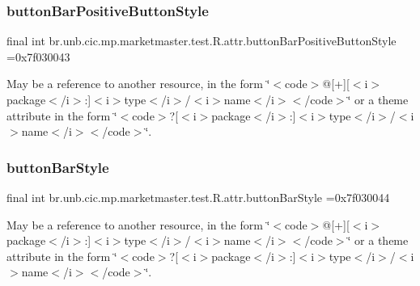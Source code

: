 \subsubsection{\texorpdfstring{button\+Bar\+Positive\+Button\+Style}{buttonBarPositiveButtonStyle}}
{\footnotesize\ttfamily final int br.\+unb.\+cic.\+mp.\+marketmaster.\+test.\+R.\+attr.\+button\+Bar\+Positive\+Button\+Style =0x7f030043\hspace{0.3cm}{\ttfamily [static]}}

May be a reference to another resource, in the form \char`\"{}$<$code$>$@\mbox{[}+\mbox{]}\mbox{[}$<$i$>$package$<$/i$>$\+:\mbox{]}$<$i$>$type$<$/i$>$/$<$i$>$name$<$/i$>$$<$/code$>$\char`\"{} or a theme attribute in the form \char`\"{}$<$code$>$?\mbox{[}$<$i$>$package$<$/i$>$\+:\mbox{]}$<$i$>$type$<$/i$>$/$<$i$>$name$<$/i$>$$<$/code$>$\char`\"{}. \mbox{\label{classbr_1_1unb_1_1cic_1_1mp_1_1marketmaster_1_1test_1_1R_1_1attr_a217283dff0831081e62770e52ced13c3}} 
\subsubsection{\texorpdfstring{button\+Bar\+Style}{buttonBarStyle}}
{\footnotesize\ttfamily final int br.\+unb.\+cic.\+mp.\+marketmaster.\+test.\+R.\+attr.\+button\+Bar\+Style =0x7f030044\hspace{0.3cm}{\ttfamily [static]}}

May be a reference to another resource, in the form \char`\"{}$<$code$>$@\mbox{[}+\mbox{]}\mbox{[}$<$i$>$package$<$/i$>$\+:\mbox{]}$<$i$>$type$<$/i$>$/$<$i$>$name$<$/i$>$$<$/code$>$\char`\"{} or a theme attribute in the form \char`\"{}$<$code$>$?\mbox{[}$<$i$>$package$<$/i$>$\+:\mbox{]}$<$i$>$type$<$/i$>$/$<$i$>$name$<$/i$>$$<$/code$>$\char`\"{}. \mbox{\label{classbr_1_1unb_1_1cic_1_1mp_1_1marketmaster_1_1test_1_1R_1_1attr_aada56bae62444d2739935881c3c1f6ae}} 
